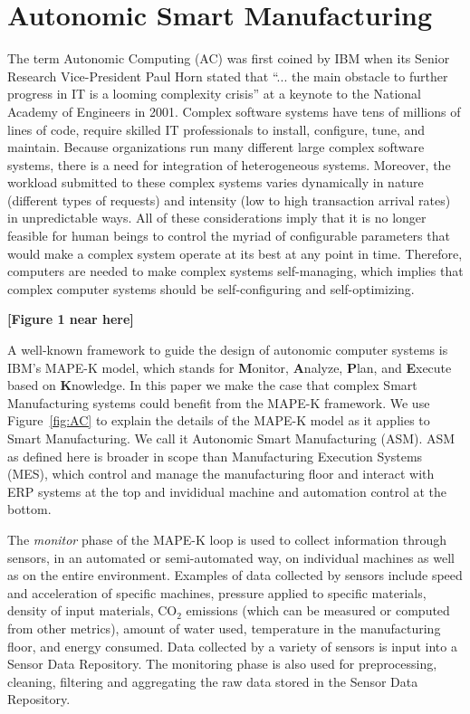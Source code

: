 \documentclass[a4paper, 12pt]{article} %
\begin{document}
\section{Autonomic Smart Manufacturing}
\label{sec:ASM}

The term Autonomic Computing (AC) was first coined by IBM when its Senior Research Vice-President Paul Horn stated that ``... the  main obstacle to further progress in IT is a looming complexity crisis'' at a keynote to the National Academy of Engineers in 2001.  Complex software systems have tens of millions of lines of code, require skilled IT professionals to install, configure, tune, and maintain.  Because organizations run many different large complex software systems, there is a need for integration of heterogeneous systems. Moreover, the workload submitted to these complex systems varies dynamically in nature (different types of requests) and intensity (low to high transaction arrival rates) in unpredictable ways. All of these considerations imply that it is no longer feasible for human beings to control the myriad of configurable parameters that would make a complex system operate at its best at any point in time. Therefore, computers are needed to make complex systems self-managing, which implies that complex computer systems should be self-configuring and self-optimizing. 

 {\bf [Figure 1 near here]}

A well-known framework to guide the design of autonomic computer systems is IBM's MAPE-K model, which stands for {\bf M}onitor, {\bf A}nalyze, {\bf P}lan, and {\bf E}xecute based on {\bf K}nowledge. In this paper we make the case that complex Smart Manufacturing systems could benefit from the MAPE-K framework. We use Figure~\ref{fig:AC} to explain the details of the MAPE-K model as it applies to Smart Manufacturing. We call it Autonomic Smart Manufacturing (ASM). ASM as defined here is broader in scope than Manufacturing Execution Systems (MES), which control and manage the manufacturing floor and interact with ERP systems at the top and invididual machine and automation control at the bottom. 


The {\em monitor\/} phase of the MAPE-K loop is used to collect information through sensors, in an automated or semi-automated way, on individual machines as well as on the entire environment. Examples of data collected by sensors include speed and acceleration of specific machines, pressure applied to specific materials, density of input materials, CO$_2$ emissions (which can be measured or computed from other metrics), amount of water used, temperature in the manufacturing floor, and energy consumed. Data collected by a variety of sensors is input into a Sensor Data Repository.  The monitoring phase is also used for preprocessing, cleaning, filtering and aggregating the raw data stored in the Sensor Data Repository. 
\end{document}
